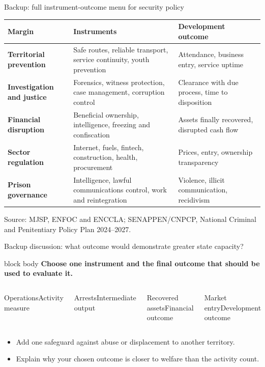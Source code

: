\documentclass[10pt,aspectratio=169]{beamer}
\newcommand{\source}[1]{%
  \par\vfill{\tiny\color{MidGray}Source: #1}}
\newcommand{\question}[1]{%
  \begin{beamercolorbox}[rounded=true,sep=0.55em,wd=\textwidth]{block body}
    \centering\large\textbf{#1}
  \end{beamercolorbox}}
\begin{document}
\begin{frame}{Backup: full instrument-outcome menu for security policy}
  \scriptsize
  \begin{tabularx}{\textwidth}{>{\bfseries}p{2.35cm}XX}
    \toprule
    Margin & Instruments & Development outcome \\
    \midrule
    Territorial prevention & Safe routes, reliable transport, service continuity, youth prevention & Attendance, business entry, service uptime \\
    Investigation and justice & Forensics, witness protection, case management, corruption control & Clearance with due process, time to disposition \\
    Financial disruption & Beneficial ownership, intelligence, freezing and confiscation & Assets finally recovered, disrupted cash flow \\
    Sector regulation & Internet, fuels, fintech, construction, health, procurement & Prices, entry, ownership transparency \\
    Prison governance & Intelligence, lawful communications control, work and reintegration & Violence, illicit communication, recidivism \\
    \bottomrule
  \end{tabularx}
  \source{MJSP, ENFOC and ENCCLA; SENAPPEN/CNPCP, National Criminal and Penitentiary Policy Plan 2024--2027.}
\end{frame}

\begin{frame}{Backup discussion: what outcome would demonstrate greater state capacity?}
  \vspace{.2cm}
  \question{Choose one instrument and the final outcome that should be used to evaluate it.}
  \vspace{.55cm}
  \begin{columns}[T,onlytextwidth]
    \begin{block}{Operations}Activity measure\end{block}
    \begin{block}{Arrests}Intermediate output\end{block}
    \begin{block}{Recovered assets}Financial outcome\end{block}
    \begin{block}{Market entry}Development outcome\end{block}
  \end{columns}
  \vspace{.55cm}
  \begin{itemize}
    \item Add one safeguard against abuse or displacement to another territory.
    \item Explain why your chosen outcome is closer to welfare than the activity count.
  \end{itemize}
\end{frame}
\end{document}
